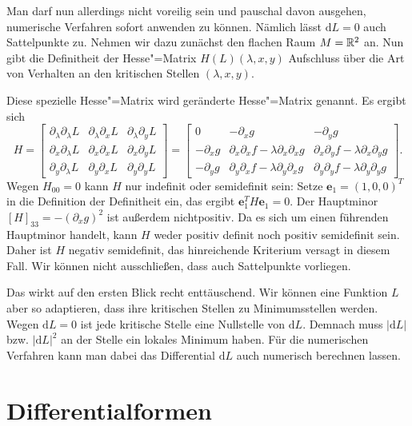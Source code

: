 Man darf nun allerdings nicht voreilig sein und pauschal davon
ausgehen, numerische Verfahren sofort anwenden zu können. Nämlich
lässt $\mathrm dL=0$ auch Sattelpunkte zu.
Nehmen wir dazu zunächst den flachen Raum $M=\mathbb R^2$ an. Nun gibt
die Definitheit der Hesse"=Matrix $H(L)(\lambda,x,y)$ Aufschluss
über die Art von Verhalten an den kritischen Stellen $(\lambda,x,y)$.

Diese spezielle Hesse"=Matrix wird geränderte Hesse"=Matrix genannt.
Es ergibt sich%
\begin{equation}
H = \begin{bmatrix}
\partial_\lambda\partial_\lambda L & \partial_\lambda\partial_x L & \partial_\lambda \partial_y L\\
\partial_x\partial_\lambda L & \partial_x\partial_x L & \partial_x\partial_y L\\
\partial_y\partial_\lambda L & \partial_y\partial_x L & \partial_y\partial_y L
\end{bmatrix}
= \begin{bmatrix}
0
& -\partial_x g
& -\partial_y g\\
-\partial_x g
& \partial_x\partial_x f-\lambda\partial_x\partial_x g
& \partial_x\partial_y f-\lambda\partial_x\partial_y g\\
-\partial_y g
& \partial_y\partial_x f-\lambda\partial_y\partial_x g
& \partial_y\partial_y f-\lambda\partial_y\partial_y g
\end{bmatrix}.
\end{equation}
Wegen $H_{00}=0$ kann $H$ nur indefinit oder
semidefinit sein: Setze $\mathbf e_1=(1,0,0)^T$ in die Definition der
Definitheit ein, das ergibt $\mathbf e_1^T H\mathbf e_1 = 0$. Der
Hauptminor $[H]_{33} = -(\partial_x g)^2$ ist außerdem nichtpositiv.
Da es sich um einen führenden Hauptminor handelt,
kann $H$ weder positiv definit noch positiv semidefinit sein. Daher
ist $H$ negativ semidefinit, das hinreichende Kriterium versagt
in diesem Fall. Wir können nicht ausschließen, dass auch Sattelpunkte
vorliegen.

Das wirkt auf den ersten Blick recht enttäuschend. Wir können
eine Funktion $L$ aber so adaptieren, dass ihre kritischen Stellen zu
Minimumsstellen werden. Wegen $\mathrm dL=0$ ist jede kritische
Stelle eine Nullstelle von $\mathrm dL$. Demnach muss
$|\mathrm dL|$ bzw. $|\mathrm dL|^2$ an der Stelle ein
lokales Minimum haben. Für die numerischen Verfahren kann man dabei
das Differential $\mathrm dL$ auch numerisch berechnen lassen.

\section{Differentialformen}

